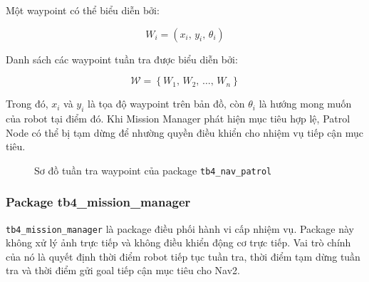 Một waypoint có thể biểu diễn bởi:

\begin{equation}
    W_i = \left(x_i,\, y_i,\, \theta_i\right)
    \label{eq:waypoint-format}
\end{equation}

Danh sách các waypoint tuần tra được biểu diễn bởi:

\begin{equation}
    \mathcal{W} = \left\{W_1,\, W_2,\, \ldots,\, W_n\right\}
    \label{eq:waypoint-set}
\end{equation}

Trong đó, $x_i$ và $y_i$ là tọa độ waypoint trên bản đồ, còn $\theta_i$ là hướng mong muốn của robot tại điểm đó. Khi Mission Manager phát hiện mục tiêu hợp lệ, Patrol Node có thể bị tạm dừng để nhường quyền điều khiển cho nhiệm vụ tiếp cận mục tiêu.

\begin{figure}[H]
\centering
{}
\caption{Sơ đồ tuần tra waypoint của package \texttt{tb4\_nav\_patrol}}
\label{fig:patrol-waypoints}
\end{figure}

\subsubsection{Package tb4\_mission\_manager}
\label{subsubsec:tb4-mission-manager}

\texttt{tb4\_mission\_manager} là package điều phối hành vi cấp nhiệm vụ. Package này không xử lý ảnh trực tiếp và không điều khiển động cơ trực tiếp. Vai trò chính của nó là quyết định thời điểm robot tiếp tục tuần tra, thời điểm tạm dừng tuần tra và thời điểm gửi goal tiếp cận mục tiêu cho Nav2.

